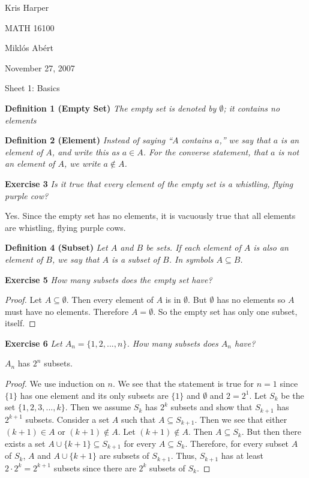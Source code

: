 \documentclass{article}
\begin{document}
\begin{flushright}
Kris Harper

MATH 16100

Mikl\'{o}s Ab\'{e}rt

November 27, 2007
\end{flushright}

\begin{flushleft}

\Large

Sheet 1: Basics\newline

\normalsize

\textbf{Definition 1 (Empty Set)}
\textsl{The empty set is denoted by $\emptyset$; it contains no elements}\newline

\textbf{Definition 2 (Element)}
\textsl{Instead of saying ``$A$ contains $a$,'' we say that $a$ is an element of $A$, and write this as $a \in A$. For the converse statement, that $a$ is not an element of $A$, we write $a \notin A$.}\newline

\textbf{Exercise 3}
\textsl{Is it true that every element of the empty set is a whistling, flying purple cow?}\newline

Yes. Since the empty set has no elements, it is vacuously true that all elements are whistling, flying purple cows.\newline

\textbf{Definition 4 (Subset)}
\textsl{Let $A$ and $B$ be sets. If each element of $A$ is also an element of $B$, we say that $A$ is a subset of $B$. In symbols $A \subseteq B$.}\newline

\textbf{Exercise 5}
\textsl{How many subsets does the empty set have?}
\begin{proof}
Let $A \subseteq \emptyset$. Then every element of $A$ is in $\emptyset$. But $\emptyset$ has no elements so $A$ must have no elements. Therefore $A = \emptyset$. So the empty set has only one subset, itself.
\end{proof}

\textbf{Exercise 6}
\textsl{Let $A_n=\{1,2,...,n\}$. How many subsets does $A_n$ have?}\newline

$A_n$ has $2^n$ subsets.
\begin{proof}
We use induction on $n$. We see that the statement is true for $n=1$ since $\{1\}$ has one element and its only subsets are $\{1\}$ and $\emptyset$ and $2=2^1$. Let $S_k$ be the set $\{1,2,3,...,k\}$. Then we assume $S_k$ has $2^k$ subsets and show that $S_{k+1}$ has $2^{k+1}$ subsets. Consider a set $A$ such that $A \subseteq S_{k+1}$. Then we see that either $(k+1) \in A$ or $(k+1) \notin A$. Let $(k+1) \notin A$. Then $A \subseteq S_k$. But then there exists a set $A \cup \{k+1\} \subseteq S_{k+1}$ for every $A \subseteq S_k$. Therefore, for every subset $A$ of $S_k$, $A$ and $A \cup \{k+1\}$ are subsets of $S_{k+1}$. Thus, $S_{k+1}$ has at least $2 \cdot 2^k=2^{k+1}$ subsets since there are $2^k$ subsets of $S_k$.\newline


\end{proof}
\end{flushleft}
\end{document}
